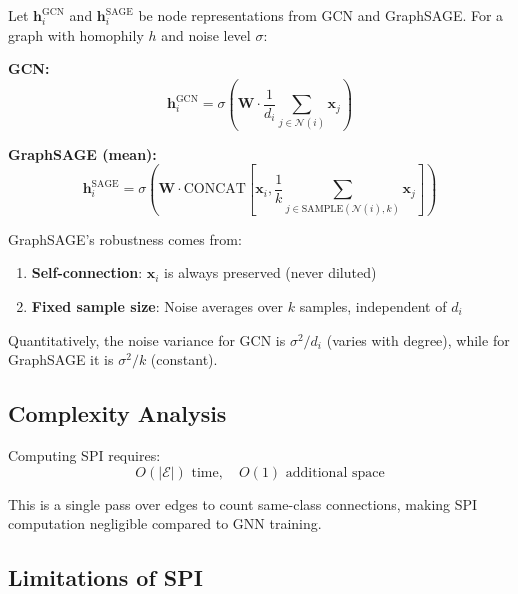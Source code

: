 \begin{proposition}
\label{prop:sage_robustness}
Let $\mathbf{h}_i^{\text{GCN}}$ and $\mathbf{h}_i^{\text{SAGE}}$ be node representations from GCN and GraphSAGE. For a graph with homophily $h$ and noise level $\sigma$:

\textbf{GCN:}
\begin{equation}
\mathbf{h}_i^{\text{GCN}} = \sigma\left(\mathbf{W} \cdot \frac{1}{d_i}\sum_{j \in \mathcal{N}(i)} \mathbf{x}_j\right)
\end{equation}

\textbf{GraphSAGE (mean):}
\begin{equation}
\mathbf{h}_i^{\text{SAGE}} = \sigma\left(\mathbf{W} \cdot \text{CONCAT}\left[\mathbf{x}_i, \frac{1}{k}\sum_{j \in \text{SAMPLE}(\mathcal{N}(i), k)} \mathbf{x}_j\right]\right)
\end{equation}

GraphSAGE's robustness comes from:
\begin{enumerate}
\item \textbf{Self-connection}: $\mathbf{x}_i$ is always preserved (never diluted)
\item \textbf{Fixed sample size}: Noise averages over $k$ samples, independent of $d_i$
\end{enumerate}

Quantitatively, the noise variance for GCN is $\sigma^2/d_i$ (varies with degree), while for GraphSAGE it is $\sigma^2/k$ (constant).
\end{proposition}

\subsection{Complexity Analysis}

\begin{proposition}
Computing SPI requires:
\begin{equation}
O(|\mathcal{E}|) \text{ time}, \quad O(1) \text{ additional space}
\end{equation}

This is a single pass over edges to count same-class connections, making SPI computation negligible compared to GNN training.
\end{proposition}

\subsection{Limitations of SPI}

